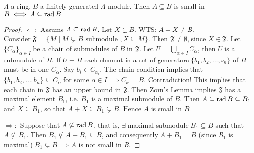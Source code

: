 \begin{prop}\label{prop:25}
$\Lambda$ a ring, $B$ a finitely generated $\Lambda$-module. Then
$A \subseteq B$ is small in $B \iff A \subseteq \operatorname{rad}\nolimits B$
\begin{proof}
  $\Leftarrow :$ Assume $A \subseteq \operatorname{rad}\nolimits B$. Let $X \subsetneq B$.
  WTS: $A+X \neq B$.\\ 
  Consider $\mathfrak{F} = \{ M \mid M \subsetneq B \text{ submodule
  }, X \subseteq M \}$. Then $\mathfrak{F} \neq \emptyset$, since
  $X \in \mathfrak{F}$.
 Let $\{ C_\alpha \}_{\alpha \in I}$ be a chain of submodules  of $B$
 in $\mathfrak{F}$. Let $U = \bigcup_{\alpha \in I} C_\alpha$, then $U$
 is a submodule of $B$. If $U = B$ each element in a set of generators
 $\{ b_1, b_2, \ldots, b_n \}$ of $B$ must be in one $C_\alpha$. Say
 $b_i \in C_{\alpha_i}$. The chain condition implies that $\{ b_1,
 b_2, \ldots, b_n \} \subseteq C_\alpha$ for some $\alpha \in I
 \implies C_\alpha = B$. Contradiction! This implies that each chain in
 $\mathfrak{F}$ has an upper bound in $\mathfrak{F}$.  Then  
 Zorn's Lemma implies $\mathfrak{F}$ has a maximal element $B_1$, i.e.
 $B_1$ is a maximal submodule of $B$.  Then $A \subseteq \operatorname{rad}\nolimits B
 \subseteq B_1$ and $X \subseteq B_1$, so that $A+X \subseteq B_1 \subsetneq
 B$.   Hence $A$ is small in $B$.

 $\Rightarrow:$ Suppose that $A \not\subseteq \operatorname{rad}\nolimits B$, that is,
  $\exists $ maximal submodule $B_1 \subseteq B$ such that
  $A \not\subseteq B_1$. Then $B_1 \not\subseteq A + B_1 \subseteq B$,
  and consequently $A+B_1 = B$ (since $B_1$ is maximal)
  $B_1 \subsetneq B \implies A$ is not small in $B$.
\end{proof}
\end{prop}

